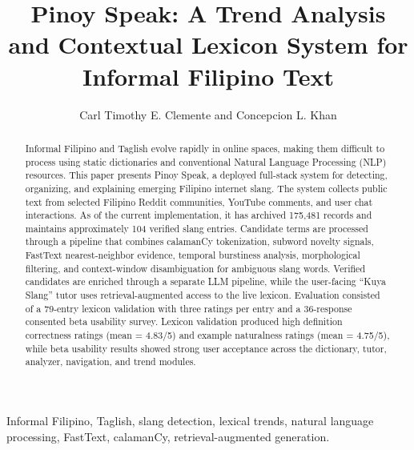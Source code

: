 \documentclass[journal]{IEEEtran}
\title{Pinoy Speak: A Trend Analysis and Contextual Lexicon System for Informal Filipino Text}
\author{Carl Timothy E. Clemente and Concepcion L. Khan}
\begin{document}
\maketitle
\thispagestyle{firststyle}

\begin{abstract}
Informal Filipino and Taglish evolve rapidly in online spaces, making them difficult to process using static dictionaries and conventional Natural Language Processing (NLP) resources. This paper presents Pinoy Speak, a deployed full-stack system for detecting, organizing, and explaining emerging Filipino internet slang. The system collects public text from selected Filipino Reddit communities, YouTube comments, and user chat interactions. As of the current implementation, it has archived 175,481 records and maintains approximately 104 verified slang entries. Candidate terms are processed through a pipeline that combines calamanCy tokenization, subword novelty signals, FastText nearest-neighbor evidence, temporal burstiness analysis, morphological filtering, and context-window disambiguation for ambiguous slang words. Verified candidates are enriched through a separate LLM pipeline, while the user-facing ``Kuya Slang'' tutor uses retrieval-augmented access to the live lexicon. Evaluation consisted of a 79-entry lexicon validation with three ratings per entry and a 36-response consented beta usability survey. Lexicon validation produced high definition correctness ratings (mean = 4.83/5) and example naturalness ratings (mean = 4.75/5), while beta usability results showed strong user acceptance across the dictionary, tutor, analyzer, navigation, and trend modules.
\end{abstract}

\begin{IEEEkeywords}
Informal Filipino, Taglish, slang detection, lexical trends, natural language processing, FastText, calamanCy, retrieval-augmented generation.
\end{IEEEkeywords}









\end{document}
